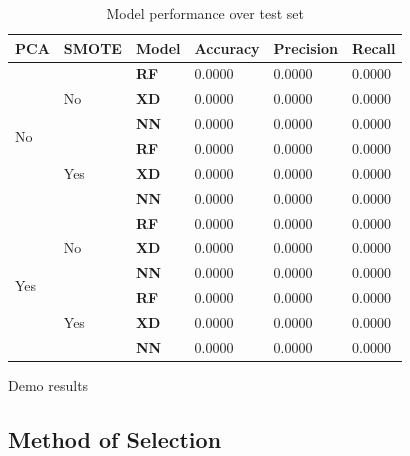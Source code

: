 \begin{table}[h]
\begin{tabular}{@{}|l|l|l|l|l|l|@{}}
\toprule
\textbf{PCA} & \textbf{SMOTE} & \textbf{Model} & \textbf{Accuracy} & \textbf{Precision} & \textbf{Recall} \\ \midrule
\multirow{6}{*}{No}  & \multirow{3}{*}{No}  & \textbf{RF} & 0.0000 & 0.0000 & 0.0000 \\ \cmidrule(l){3-6} 
                     &                      & \textbf{XD} & 0.0000 & 0.0000 & 0.0000 \\ \cmidrule(l){3-6} 
                     &                      & \textbf{NN} & 0.0000 & 0.0000 & 0.0000 \\ \cmidrule(l){2-6} 
                     & \multirow{3}{*}{Yes} & \textbf{RF} & 0.0000 & 0.0000 & 0.0000 \\ \cmidrule(l){3-6} 
                     &                      & \textbf{XD} & 0.0000 & 0.0000 & 0.0000 \\ \cmidrule(l){3-6} 
                     &                      & \textbf{NN} & 0.0000 & 0.0000 & 0.0000 \\ \midrule
\multirow{6}{*}{Yes} & \multirow{3}{*}{No}  & \textbf{RF} & 0.0000 & 0.0000 & 0.0000 \\ \cmidrule(l){3-6} 
                     &                      & \textbf{XD} & 0.0000 & 0.0000 & 0.0000 \\ \cmidrule(l){3-6} 
                     &                      & \textbf{NN} & 0.0000 & 0.0000 & 0.0000 \\ \cmidrule(l){2-6} 
                     & \multirow{3}{*}{Yes} & \textbf{RF} & 0.0000 & 0.0000 & 0.0000 \\ \cmidrule(l){3-6} 
                     &                      & \textbf{XD} & 0.0000 & 0.0000 & 0.0000 \\ \cmidrule(l){3-6} 
                     &                      & \textbf{NN} & 0.0000 & 0.0000 & 0.0000 \\ \bottomrule
\end{tabular}
\caption{Model performance over test set}
\label{tab:model performance}
\end{table}

\begin{table}
    
    \caption{Demo results}
    \label{tab:results}
\end{table}


\subsection{Method of Selection}
